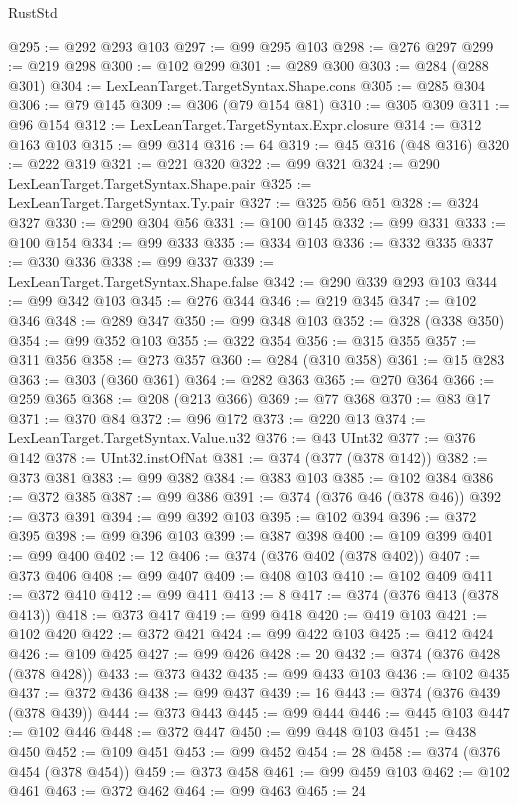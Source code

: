 \begin{lexlean}{RustStd}
\begin{coremodule}
@295 := @292 @293 @103
@297 := @99 @295 @103
@298 := @276 @297
@299 := @219 @298
@300 := @102 @299
@301 := @289 @300
@303 := @284 (@288 @301)
@304 := LexLeanTarget.TargetSyntax.Shape.cons
@305 := @285 @304
@306 := @79 @145
@309 := @306 (@79 @154 @81)
@310 := @305 @309
@311 := @96 @154
@312 := LexLeanTarget.TargetSyntax.Expr.closure
@314 := @312 @163 @103
@315 := @99 @314
@316 := 64
@319 := @45 @316 (@48 @316)
@320 := @222 @319
@321 := @221 @320
@322 := @99 @321
@324 := @290 LexLeanTarget.TargetSyntax.Shape.pair
@325 := LexLeanTarget.TargetSyntax.Ty.pair
@327 := @325 @56 @51
@328 := @324 @327
@330 := @290 @304 @56
@331 := @100 @145
@332 := @99 @331
@333 := @100 @154
@334 := @99 @333
@335 := @334 @103
@336 := @332 @335
@337 := @330 @336
@338 := @99 @337
@339 := LexLeanTarget.TargetSyntax.Shape.false
@342 := @290 @339 @293 @103
@344 := @99 @342 @103
@345 := @276 @344
@346 := @219 @345
@347 := @102 @346
@348 := @289 @347
@350 := @99 @348 @103
@352 := @328 (@338 @350)
@354 := @99 @352 @103
@355 := @322 @354
@356 := @315 @355
@357 := @311 @356
@358 := @273 @357
@360 := @284 (@310 @358)
@361 := @15 @283
@363 := @303 (@360 @361)
@364 := @282 @363
@365 := @270 @364
@366 := @259 @365
@368 := @208 (@213 @366)
@369 := @77 @368
@370 := @83 @17
@371 := @370 @84
@372 := @96 @172
@373 := @220 @13
@374 := LexLeanTarget.TargetSyntax.Value.u32
@376 := @43 UInt32
@377 := @376 @142
@378 := UInt32.instOfNat
@381 := @374 (@377 (@378 @142))
@382 := @373 @381
@383 := @99 @382
@384 := @383 @103
@385 := @102 @384
@386 := @372 @385
@387 := @99 @386
@391 := @374 (@376 @46 (@378 @46))
@392 := @373 @391
@394 := @99 @392 @103
@395 := @102 @394
@396 := @372 @395
@398 := @99 @396 @103
@399 := @387 @398
@400 := @109 @399
@401 := @99 @400
@402 := 12
@406 := @374 (@376 @402 (@378 @402))
@407 := @373 @406
@408 := @99 @407
@409 := @408 @103
@410 := @102 @409
@411 := @372 @410
@412 := @99 @411
@413 := 8
@417 := @374 (@376 @413 (@378 @413))
@418 := @373 @417
@419 := @99 @418
@420 := @419 @103
@421 := @102 @420
@422 := @372 @421
@424 := @99 @422 @103
@425 := @412 @424
@426 := @109 @425
@427 := @99 @426
@428 := 20
@432 := @374 (@376 @428 (@378 @428))
@433 := @373 @432
@435 := @99 @433 @103
@436 := @102 @435
@437 := @372 @436
@438 := @99 @437
@439 := 16
@443 := @374 (@376 @439 (@378 @439))
@444 := @373 @443
@445 := @99 @444
@446 := @445 @103
@447 := @102 @446
@448 := @372 @447
@450 := @99 @448 @103
@451 := @438 @450
@452 := @109 @451
@453 := @99 @452
@454 := 28
@458 := @374 (@376 @454 (@378 @454))
@459 := @373 @458
@461 := @99 @459 @103
@462 := @102 @461
@463 := @372 @462
@464 := @99 @463
@465 := 24

\end{coremodule}
\end{lexlean}
